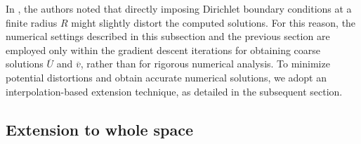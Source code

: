 \documentclass[11pt,a4paper]{article}
\numberwithin{equation}{section}
\begin{document}
\begin{remark}
   In \cite{guillod2023numerical}, the authors noted that directly imposing
  Dirichlet boundary conditions at a finite radius $R$ might slightly distort
  the computed solutions. For this reason, the numerical settings described in
  this subsection and the previous section are employed only within the
  gradient descent iterations for obtaining coarse solutions $\overline{U}$
  and $\overline{v}$, rather than for rigorous numerical analysis. To minimize
  potential distortions and obtain accurate numerical solutions, we adopt an
  interpolation-based extension technique, as detailed in the subsequent
  section.
\end{remark}

\subsection{Extension to whole space}\label{sec:ext}
\end{document}
